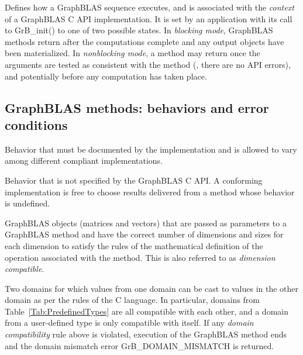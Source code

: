  Defines how a GraphBLAS sequence executes, and is associated 
with the {\it context} of a GraphBLAS C API implementation. It is set by an 
application with its call to {\sf GrB\_init()} to one of two possible states.  
In \emph{blocking mode}, GraphBLAS methods return after the computations 
complete and any output objects have been materialized.  In {\it nonblocking mode}, a 
method may return once the arguments are tested as consistent with 
the method (\ie, there are no API errors), and potentially before any computation 
has taken place.
\glossEnd

\subsection{GraphBLAS methods: behaviors and error conditions}
\glossBegin
{} Behavior that must be documented
by the implementation and is allowed to vary among different
compliant implementations. 

 Behavior that is not specified by the GraphBLAS C API.
A conforming implementation is free to choose results delivered from a method
whose behavior is undefined. 


 GraphBLAS objects (matrices and vectors) that are
passed as parameters to a GraphBLAS method and have the correct number of dimensions 
and sizes for each dimension to satisfy the rules of the mathematical definition 
of the operation associated with the method.  This is also referred to as 
\emph{dimension compatible}.

 Two domains for which values from one domain can be 
cast to values in the other domain as per the rules of the C language. In particular, 
domains from Table~\ref{Tab:PredefinedTypes} 
are all compatible with each other, and a domain from a user-defined type is only 
compatible with itself. If any \emph{domain compatibility} rule above is 
violated, execution of the GraphBLAS method ends and the domain 
mismatch error {\sf GrB\_DOMAIN\_MISMATCH} is returned.
\glossEnd

